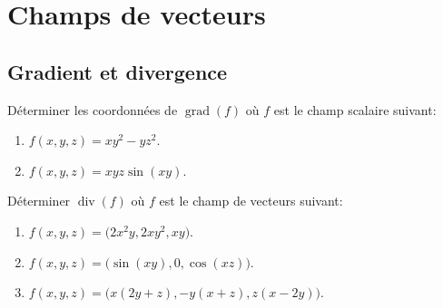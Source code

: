 \section*{Champs de vecteurs}
\vspace{1em}

\subsection{Gradient et divergence}

Déterminer les coordonnées de $\operatorname{grad}(f)$ où $f$ est le champ scalaire suivant:
\begin{enumerate}[itemsep=0.5em]
    \item $f(x, y, z)=x y^2-y z^2$.
    \item $f(x, y, z)=x y z \sin (x y)$.
\end{enumerate}

\vspace{1em}
Déterminer $\operatorname{div}(f)$ où $f$ est le champ de vecteurs suivant:
\begin{enumerate}[itemsep=0.5em]
    \item $f(x, y, z)=\big(2 x^2 y, 2 x y^2, x y\big)$.
    \item $f(x, y, z)=\big(\sin (x y), 0, \cos (x z)\big)$.
    \item $f(x, y, z)=\big(x(2 y+z),-y(x+z), z(x-2 y)\big)$.
\end{enumerate}



